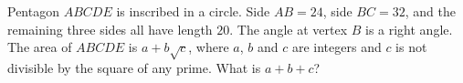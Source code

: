 Pentagon $ABCDE$ is inscribed in a circle. Side $AB=24$, side $BC=32$, and the remaining three sides all have length $20$. The angle at vertex $B$ is a right angle. The area of $ABCDE$ is $a+b\sqrt c$, where $a$, $b$ and $c$ are integers and $c$ is not divisible by the square of any prime. What is $a+b+c$?
